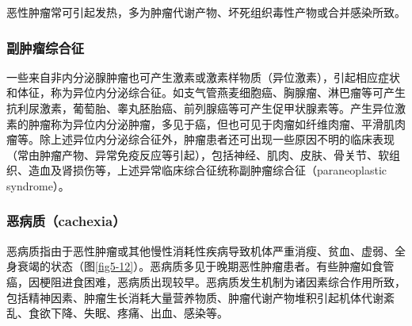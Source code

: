 恶性肿瘤常可引起发热，多为肿瘤代谢产物、坏死组织毒性产物或合并感染所致。

\subsubsection{副肿瘤综合征}

一些来自非内分泌腺肿瘤也可产生激素或激素样物质（异位激素），引起相应症状和体征，称为异位内分泌综合征。如支气管燕麦细胞癌、胸腺瘤、淋巴瘤等可产生抗利尿激素，葡萄胎、睾丸胚胎癌、前列腺癌等可产生促甲状腺素等。产生异位激素的肿瘤称为异位内分泌肿瘤，多见于癌，但也可见于肉瘤如纤维肉瘤、平滑肌肉瘤等。除上述异位内分泌综合征外，肿瘤患者还可出现一些原因不明的临床表现（常由肿瘤产物、异常免疫反应等引起），包括神经、肌肉、皮肤、骨关节、软组织、造血及肾损伤等，上述异常临床综合征统称副肿瘤综合征（paraneoplastic
syndrome）。

\subsubsection{恶病质（cachexia）}

恶病质指由于恶性肿瘤或其他慢性消耗性疾病导致机体严重消瘦、贫血、虚弱、全身衰竭的状态（图\ref{fig5-12}）。恶病质多见于晚期恶性肿瘤患者。有些肿瘤如食管癌，因梗阻进食困难，恶病质出现较早。恶病质发生机制为诸因素综合作用所致，包括精神因素、肿瘤生长消耗大量营养物质、肿瘤代谢产物堆积引起机体代谢紊乱、食欲下降、失眠、疼痛、出血、感染等。

